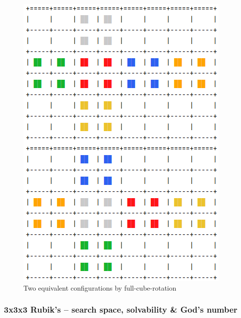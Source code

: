 \begin{figure}[H]
\centering
\includegraphics[scale=0.4]{./Figures/equivalentcubes}
\caption[Reducing RC]{Two equivalent configurations by full-cube-rotation}
\label{fig:configurations}
\end{figure}



\subsubsection{3x3x3 Rubik's -- search space, solvability \& God's number}


